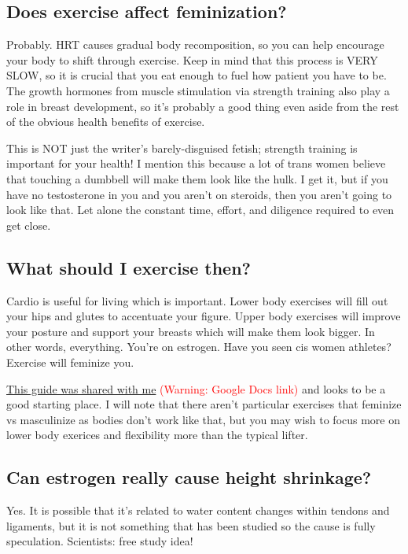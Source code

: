 \documentclass{article}
\begin{document}
{{\subsection{Does exercise affect feminization?}

Probably. HRT causes gradual body recomposition, so you can help encourage your body to shift through exercise. Keep in mind that this process is VERY SLOW, so it is crucial that you eat enough to fuel how patient you have to be. The growth hormones from muscle stimulation via strength training also play a role in breast development, so it’s probably a good thing even aside from the rest of the obvious health benefits of exercise.

This is NOT just the writer’s barely-disguised fetish; strength training is important for your health! I mention this because a lot of trans women believe that touching a dumbbell will make them look like the hulk. I get it, but if you have no testosterone in you and you aren’t on steroids, then you aren’t going to look like that. Let alone the constant time, effort, and diligence required to even get close.

\subsection{What should I exercise then?}\label{11-16}

Cardio is useful for living which is important. Lower body exercises will fill out your hips and glutes to accentuate your figure. Upper body exercises will improve your posture and support your breasts which will make them look bigger. In other words, everything. You’re on estrogen. Have you seen cis women athletes? Exercise will feminize you.

\href{https://docs.google.com/document/d/1-NyE5EY5TTaRRMhk7HlTbKJ7HifjEsA4jlDO1qKQVl0/edit?tab=t.0}{This guide was shared with me} \textcolor{red}{(Warning: Google Docs link)} and looks to be a good starting place. I will note that there aren't particular exercises that feminize vs masculinize as bodies don't work like that, but you may wish to focus more on lower body exerices and flexibility more than the typical lifter.

\subsection{Can estrogen really cause height shrinkage?}

Yes. It is possible that it’s related to water content changes within tendons and ligaments, but it is not something that has been studied so the cause is fully speculation. Scientists: free study idea!

}}
\end{document}
